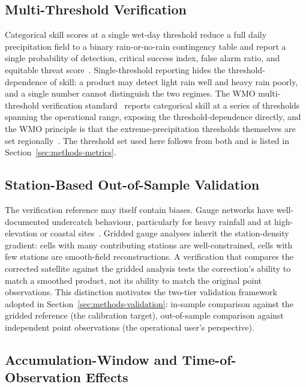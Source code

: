 \subsection{Multi-Threshold Verification}

Categorical skill scores at a single wet-day threshold reduce a
full daily precipitation field to a binary rain-or-no-rain
contingency table and report a single probability of detection,
critical success index, false alarm ratio, and equitable threat
score~\citep{ref:wilks2020}. Single-threshold reporting hides the
threshold-dependence of skill: a product may detect light rain
well and heavy rain poorly, and a single number cannot
distinguish the two regimes. The WMO multi-threshold
verification standard~\citep{ref:wmo1485} reports categorical
skill at a series of thresholds spanning the operational range,
exposing the threshold-dependence directly, and the WMO principle
is that the extreme-precipitation thresholds themselves are set
regionally~\citep{ref:wmo1310}. The threshold set used here
follows from both and is listed in
Section~\ref{sec:methods-metrics}.

\subsection{Station-Based Out-of-Sample Validation}

The verification reference may itself contain biases. Gauge
networks have well-documented undercatch behaviour, particularly
for heavy rainfall and at high-elevation or coastal
sites~\citep{ref:adam2003}. Gridded gauge analyses inherit the
station-density gradient: cells with many contributing stations
are well-constrained, cells with few stations are smooth-field
reconstructions. A verification that compares the corrected
satellite against the gridded analysis tests the correction's
ability to match a smoothed product, not its ability to match
the original point observations. This distinction motivates the
two-tier validation framework adopted in
Section~\ref{sec:methods-validation}: in-sample comparison
against the gridded reference (the calibration target),
out-of-sample comparison against independent point observations
(the operational user's perspective).

\subsection{Accumulation-Window and Time-of-Observation Effects}\label{sec:lit-window}


